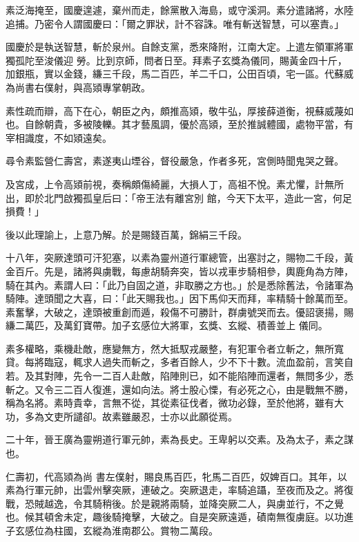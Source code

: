 \begin{pinyinscope}
 素泛海掩至，國慶遑遽，棄州而走，餘黨散入海島，或守溪洞。素分遣諸將，水陸追捕。乃密令人謂國慶曰：「爾之罪狀，計不容誅。唯有斬送智慧，可以塞責。」



 國慶於是執送智慧，斬於泉州。自餘支黨，悉來降附，江南大定。上遣左領軍將軍獨孤陀至浚儀迎
 勞。比到京師，問者日至。拜素子玄獎為儀同，賜黃金四十斤，加銀瓶，實以金錢，縑三千段，馬二百匹，羊二千口，公田百頃，宅一區。代蘇威為尚書右僕射，與高熲專掌朝政。



 素性疏而辯，高下在心，朝臣之內，頗推高熲，敬牛弘，厚接薛道衡，視蘇威蔑如也。自餘朝貴，多被陵轢。其才藝風調，優於高熲，至於推誠體國，處物平當，有宰相識度，不如熲遠矣。



 尋令素監營仁壽宮，素遂夷山堙谷，督役嚴急，作者多死，宮側時聞鬼哭之聲。



 及宮成，上令高熲前視，奏稱頗傷綺麗，大損人丁，高祖不悅。素尤懼，計無所出，即於北門啟獨孤皇后曰：「帝王法有離宮別
 館，今天下太平，造此一宮，何足損費！」



 後以此理諭上，上意乃解。於是賜錢百萬，錦絹三千段。



 十八年，突厥達頭可汗犯塞，以素為靈州道行軍總管，出塞討之，賜物二千段，黃金百斤。先是，諸將與虜戰，每慮胡騎奔突，皆以戎車步騎相參，輿鹿角為方陣，騎在其內。素謂人曰：「此乃自固之道，非取勝之方也。」於是悉除舊法，令諸軍為騎陣。達頭聞之大喜，曰：「此天賜我也。」因下馬仰天而拜，率精騎十餘萬而至。素奮擊，大破之，達頭被重創而遁，殺傷不可勝計，群虜號哭而去。優詔褒揚，賜縑二萬匹，及萬釘寶帶。加子玄感位大將軍，玄獎、玄縱、積善並上
 儀同。



 素多權略，乘機赴敵，應變無方，然大抵馭戎嚴整，有犯軍令者立斬之，無所寬貸。每將臨寇，輒求人過失而斬之，多者百餘人，少不下十數。流血盈前，言笑自若。及其對陣，先令一二百人赴敵，陷陣則已，如不能陷陣而還者，無問多少，悉斬之。又令三二百人復進，還如向法。將士股心慄，有必死之心，由是戰無不勝，稱為名將。素時貴幸，言無不從，其從素征伐者，微功必錄，至於他將，雖有大功，多為文吏所譴卻。故素雖嚴忍，士亦以此願從焉。



 二十年，晉王廣為靈朔道行軍元帥，素為長史。王卑躬以交素。及為太子，素之謀也。



 仁壽初，代高熲為尚
 書左僕射，賜良馬百匹，牝馬二百匹，奴婢百口。其年，以素為行軍元帥，出雲州擊突厥，連破之。突厥退走，率騎追躡，至夜而及之。將復戰，恐賊越逸，令其騎稍後。於是親將兩騎，並降突厥二人，與虜並行，不之覺也。候其頓舍未定，趣後騎掩擊，大破之。自是突厥遠遁，磧南無復虜庭。以功進子玄感位為柱國，玄縱為淮南郡公。賞物二萬段。




\end{pinyinscope}
